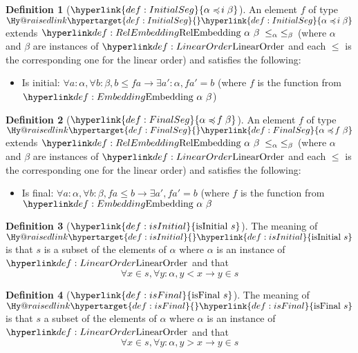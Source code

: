 \documentclass{article}
\makeatletter
\newcommand\newlink[2]{{\protect\hyperlink{#1}{\normalcolor #2}}}
\newcommand\newtarget[2]{\Hy@raisedlink{\hypertarget{#1}{}}#2}
\theoremstyle{definition}
\newtheorem{definition}{Definition}
\makeatother
\begin{document}
\newcommand\InitialSeg[2]{\newlink{def:InitialSeg}{#1 \preccurlyeq\! i\; #2}}
\begin{definition}[$\InitialSeg{\alpha}{\beta}$]
An element $f$ of type $\newtarget{def:InitialSeg}{\InitialSeg{\alpha}{\beta}}$ extends $\RelEmbedding{\alpha}{\beta}{\le_\alpha}{\le_\beta}$ (where $\alpha$ and $\beta$ are instances of $\LinearOrder$ and each $\le$ is the corresponding one for the linear order) and satisfies the following:
\begin{itemize}
\item Is initial: $\forall a : \alpha,\forall b : \beta, b \le fa \to \exists a' : \alpha, fa' = b$ (where $f$ is the function from $\Embedding{\alpha}{\beta}$)
\end{itemize}
\end{definition}

\newcommand\FinalSeg[2]{\newlink{def:FinalSeg}{#1 \preccurlyeq\! f\; #2}}
\begin{definition}[$\FinalSeg{\alpha}{\beta}$]
An element $f$ of type $\newtarget{def:FinalSeg}{\FinalSeg{\alpha}{\beta}}$ extends $\RelEmbedding{\alpha}{\beta}{\le_\alpha}{\le_\beta}$ (where $\alpha$ and $\beta$ are instances of $\LinearOrder$ and each $\le$ is the corresponding one for the linear order) and satisfies the following:
\begin{itemize}
\item Is final: $\forall a : \alpha, \forall b : \beta, fa \le b \to \exists a', fa' = b$ (where $f$ is the function from $\Embedding{\alpha}{\beta}$
\end{itemize}
\end{definition}

\newcommand\isInitial[1]{\newlink{def:isInitial}{\text{isInitial } #1}}
\begin{definition}[$\isInitial{s}$]
The meaning of $\newtarget{def:isInitial}{\isInitial{s}}$ is that $s$ is a subset of the elements of $\alpha$ where $\alpha$ is an instance of $\LinearOrder$ and that
\[
\forall x \in s, \forall y : \alpha, y < x \to y \in s
\]
\end{definition}

\newcommand\isFinal[1]{\newlink{def:isFinal}{\text{isFinal } #1}}
\begin{definition}[$\isFinal{s}$]
The meaning of $\newtarget{def:isFinal}{\isFinal{s}}$ is that $s$ a subset of the elements of $\alpha$ where $\alpha$ is an instance of $\LinearOrder$ and that
\[
\forall x \in s, \forall y : \alpha, y > x \to y \in s
\]
\end{definition}
\end{document}
